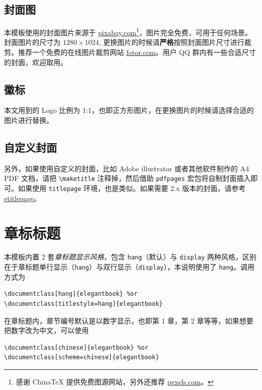 \documentclass[lang=cn,10pt,cite=super]{elegantbook}
\begin{document}
\subsection{封面图}

本模板使用的封面图片来源于 \href{https://pixabay.com/en/tea-time-poetry-coffee-reading-3240766/}{pixabay.com}\footnote{感谢 China\TeX{} 提供免费图源网站，另外还推荐 \href{https://www.pexels.com/}{pexels.com}。}，图片完全免费，可用于任何场景。封面图片的尺寸为 $1280 \times 1024$, 更换图片的时候请\textbf{严格}按照封面图片尺寸进行裁剪。推荐一个免费的在线图片裁剪网站 \href{https://www.fotor.com/cn}{fotor.com}。用户 QQ 群内有一些合适尺寸的封面，欢迎取用。

\subsection{徽标}

本文用到的 Logo 比例为 1:1，也即正方形图片，在更换图片的时候请选择合适的图片进行替换。

\subsection{自定义封面}

另外，如果使用自定义的封面，比如 Adobe illustrator 或者其他软件制作的 A4 PDF 文档，请把 \lstinline{\maketitle} 注释掉，然后借助 \lstinline{pdfpages} 宏包将自制封面插入即可。如果使用 \lstinline{titlepage} 环境，也是类似。如果需要 2.x 版本的封面，请参考 \href{https://github.com/EthanDeng/etitlepage}{etitlepage}。

\section{章标标题}

本模板内置 2 套\textit{章标题显示风格}，包含 \lstinline{hang}（默认）与 \lstinline{display} 两种风格，区别在于章标题单行显示（\lstinline{hang}）与双行显示（\lstinline{display}），本说明使用了 \lstinline{hang}。调用方式为
\begin{lstlisting}
\documentclass[hang]{elegantbook} %or
\documentclass[titlestyle=hang]{elegantbook}
\end{lstlisting}

在章标题内，章节编号默认是以数字显示，也即{\kaishu 第 1 章}，{\kaishu 第 2 章}等等，如果想要把数字改为中文，可以使用
\begin{lstlisting}
\documentclass[chinese]{elegantbook} %or
\documentclass[scheme=chinese]{elegantbook}
\end{lstlisting}
\end{document}
